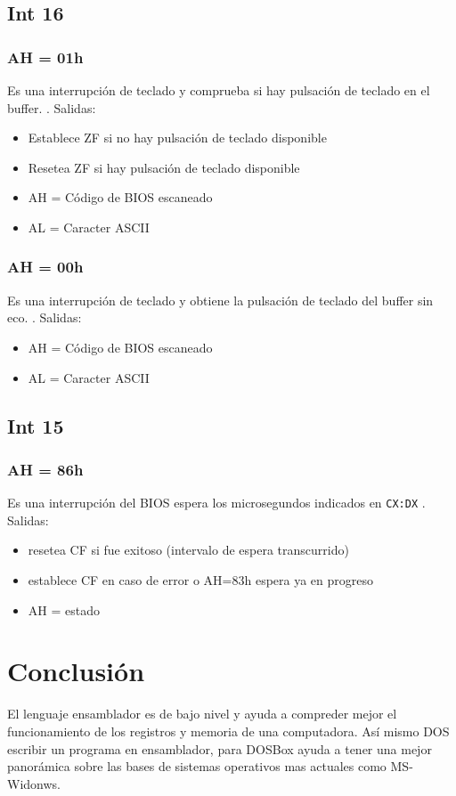 \documentclass[journal]{../../IEEEtran/IEEEtran}
\begin{document}
\subsection{Int 16}

\subsubsection{AH = 01h}
Es una interrupción de teclado y comprueba si hay pulsación de teclado
en el buffer.  \cite{int16_01}. Salidas:
\begin{itemize}
\item Establece ZF si no hay pulsación de teclado disponible
\item Resetea ZF si hay pulsación de teclado disponible
\item AH = Código de BIOS escaneado
\item AL = Caracter ASCII
\end{itemize}


\subsubsection{AH = 00h}
Es una interrupción de teclado y obtiene la pulsación de teclado
del buffer sin eco.  \cite{int16_00}. Salidas:
\begin{itemize}
\item AH = Código de BIOS escaneado
\item AL = Caracter ASCII
\end{itemize}

\subsection{Int 15}

\subsubsection{AH = 86h}
Es una interrupción del BIOS espera los microsegundos indicados en
\verb|CX:DX| \cite{int15_86}. Salidas: 
\begin{itemize}
\item resetea CF si fue exitoso (intervalo de espera transcurrido)
\item establece CF en caso de error o AH=83h espera ya en progreso
\item AH =  estado
\end{itemize}



\section{Conclusión}
El lenguaje ensamblador es de bajo nivel y ayuda a compreder mejor el
funcionamiento de los registros y memoria de una computadora. Así
mismo DOS escribir un programa en ensamblador, para DOSBox ayuda a
tener una mejor panorámica sobre las bases de sistemas operativos mas
actuales como MS-Widonws.
\end{document}
